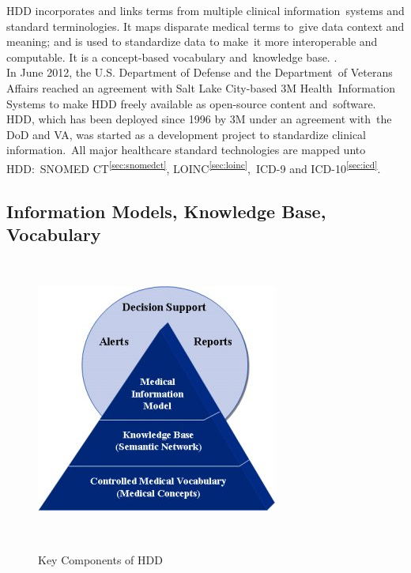\documentclass[DIV=calc, paper=a4, fontsize=12pt, onecolumn]{scrartcl}	 %
\begin{document}
  \noindent HDD incorporates and links terms from multiple clinical information\
  systems and standard terminologies. It maps disparate medical terms to\
  give data context and meaning; and is used to standardize data to make\
  it more interoperable and computable. It is a concept-based vocabulary and\
  knowledge base. \citep{_3M_Healthcare_Data_Dictionary_2013}.\\

  \noindent In June 2012, the U.S. Department of Defense and the Department\
  of Veterans Affairs reached an agreement with Salt Lake City-based 3M Health\
  Information Systems to make HDD freely available as open-source content and\
  software. HDD, which has been deployed since 1996 by 3M under an agreement with\
  the DoD and VA, was started as a development project to standardize clinical information.\
  All major healthcare standard technologies are mapped unto HDD:\
  SNOMED CT\textsuperscript{\ref{sec:snomedct}}, LOINC\textsuperscript{\ref{sec:loinc}},\
  ICD-9 and ICD-10\textsuperscript{\ref{sec:icd}}.\citep{_DeGaspari_2013}\
 
  \subsection{Information Models, Knowledge Base, Vocabulary}\

  \begin{figure}[ht!]
    \label{fig:ikv}
    \centering
    \includegraphics[scale=0.75]{hdd.jpg}
    \caption{Key Components of HDD}\citep{_3M_HDD_Product_Overview_2010}\
  \end{figure}  
\end{document}
